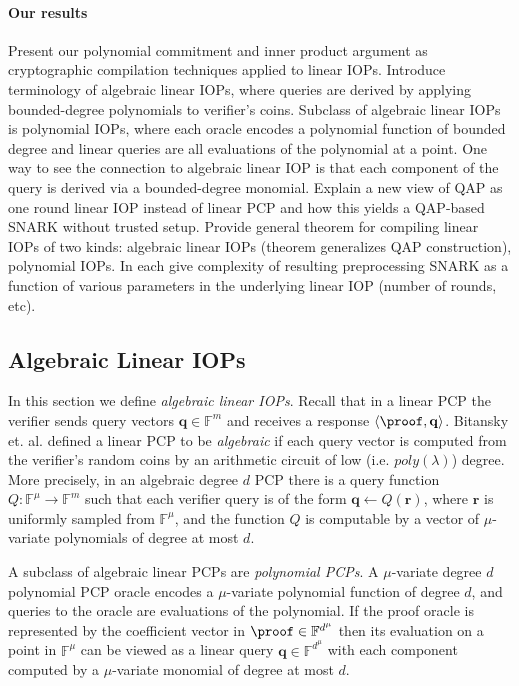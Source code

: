 \paragraph{Our results} Present our polynomial commitment and inner product argument as cryptographic compilation techniques applied to linear IOPs. Introduce terminology of algebraic linear IOPs, where queries are derived by applying bounded-degree polynomials to verifier’s coins. Subclass of algebraic linear IOPs is polynomial IOPs, where each oracle encodes a polynomial function of bounded degree and linear queries are all evaluations of the polynomial at a point. One way to see the connection to algebraic linear IOP is that each component of the query is derived via a bounded-degree monomial. 
Explain a new view of QAP as one round linear IOP instead of linear PCP and how this yields a QAP-based SNARK without trusted setup. Provide general theorem for compiling linear IOPs of two kinds: algebraic linear IOPs (theorem generalizes QAP construction), polynomial IOPs. In each give complexity of resulting preprocessing SNARK as a function of various parameters in the underlying linear IOP (number of rounds, etc). 

\subsection{Algebraic Linear IOPs} 

In this section we define \emph{algebraic linear IOPs}. Recall that in a linear PCP the verifier sends query vectors $\mathbf{q} \in \mathbb{F}^m$ and receives a response $\langle \proof, \mathbf{q} \rangle$. Bitansky et. al. \cite{Bitansky} defined a linear PCP to be \emph{algebraic} if each query vector is computed from the verifier's random coins by an arithmetic circuit of low (i.e. $poly(\lambda)$) degree. More precisely, in an algebraic degree $d$ PCP there is a query function $Q: \mathbb{F}^\mu \rightarrow \mathbb{F}^m$ such that each verifier query is of the form $\mathbf{q} \leftarrow Q(\mathbf{r})$, where $\mathbf{r}$ is uniformly sampled from $\mathbb{F}^\mu$, and the function $Q$ is computable by a vector of $\mu$-variate polynomials of degree at most $d$. 

A subclass of algebraic linear PCPs are \emph{polynomial PCPs}. A $\mu$-variate degree $d$ polynomial PCP oracle encodes a $\mu$-variate polynomial function of degree $d$, and queries to the oracle are evaluations of the polynomial. If the proof oracle is represented by the coefficient vector in $\proof \in \mathbb{F}^{d^\mu}$ then its evaluation on a point in $\mathbb{F}^\mu$ can be viewed as a linear query $\mathbf{q} \in \mathbb{F}^{d^\mu}$ with each component computed by a $\mu$-variate monomial of degree at most $d$. 

